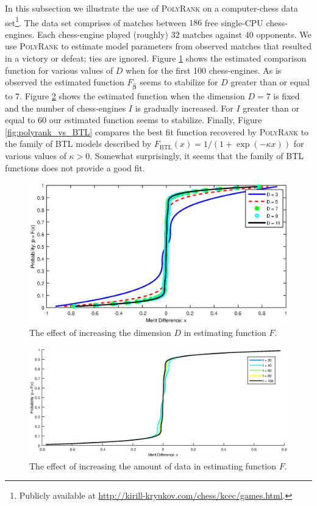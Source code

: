 \documentclass[twoside,11pt]{article}
\begin{document}
In this subsection we illustrate the use of \textsc{PolyRank} on a computer-chess data set\footnote{Publicly available at \url{http://kirill-kryukov.com/chess/kcec/games.html}.}. The data set comprises of matches between $186$ free single-CPU chess-engines. Each chess-engine played (roughly) $32$ matches against $40$  opponents. We use \textsc{PolyRank} to estimate model parameters from observed matches that resulted in a victory or defeat; ties are ignored. Figure \ref{fig:chess_more_dimensions} shows the estimated comparison function for various values of $D$ when  for the first 100 chess-engines. As is observed the estimated function $F_{\boldsymbol{\hat \beta}}$ seems to stabilize for  $D$ greater than or equal to $7$. Figure \ref{fig:chess_more_data} shows the estimated function when the dimension $D = 7$ is fixed and the number of chess-engines $I$ is gradually increased. For $I$ greater than or equal to $60$ our estimated function seems to stabilize. Finally, Figure \ref{fig:polyrank_vs_BTL} compares the best fit function recovered by \textsc{PolyRank} to the family of BTL models described by $F_{\text{BTL}}(x) = 1/(1+\exp(-\kappa x))$ for various values of $\kappa >0$. Somewhat surprisingly, it seems that the family of BTL functions  does not provide a good fit.

\begin{figure}
  \centering
    \includegraphics[width=1\textwidth]{chess_more_dimensions.eps}
    \caption{The effect of increasing the dimension $D$ in estimating function $F$. \label{fig:chess_more_dimensions}}
\end{figure}

\begin{figure}
  \centering
    \includegraphics[width=1\textwidth]{chess_more_data.eps}
    \caption{The effect of increasing the amount of data in estimating function $F$. \label{fig:chess_more_data}}
\end{figure}
\end{document}
